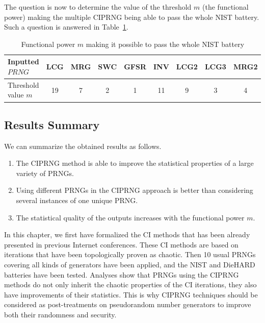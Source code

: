 The question is now to determine the value of the threshold $m$ (the functional power) making 
the multiple CIPRNG being able to pass the whole NIST battery.
Such a question is answered in Table~\ref{threshold}.


\begin{table}
\renewcommand{\arraystretch}{1.3}
\caption{Functional power $m$ making it possible to pass the whole NIST battery}
\label{threshold}
\centering
  \begin{tabular}{|l||c|c|c|c|c|c|c|c|}
    \hline
Inputted $PRNG$ & LCG & MRG & SWC & GFSR & INV& LCG2 & LCG3  & MRG2 \\ \hline\hline
Threshold  value $m$& 19 & 7  & 2& 1 & 11& 9& 3& 4\\ \hline\hline
\end{tabular}
\end{table}

\subsection{Results Summary}

We can summarize the obtained results as follows.
\begin{enumerate}
\item The CIPRNG method is able to improve the statistical properties of a large variety of PRNGs.
\item Using different PRNGs in the CIPRNG approach is better than considering several instances of one unique PRNG.
\item The statistical quality of the outputs increases with the functional power $m$.
\end{enumerate}

In this chapter, we first have formalized the CI methods that has been already presented in previous Internet conferences.
These CI methods are based on iterations that have been topologically proven as chaotic.
Then 10 usual PRNGs covering all kinds of generators have been applied, and the NIST and DieHARD batteries have been tested.
Analyses show that PRNGs using the CIPRNG methods do not only inherit the chaotic properties of the
CI iterations, they also have improvements of their statistics.
This is why CIPRNG techniques should be considered as post-treatments on pseudorandom number generators to improve both their randomness and security.

